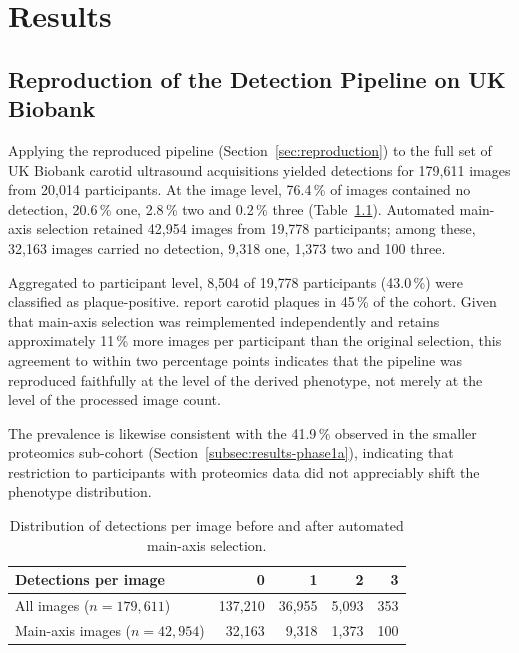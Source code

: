 \chapter{Results}
\label{ch:results}

\section{Reproduction of the Detection Pipeline on UK Biobank}
\label{sec:results-reproduction}

Applying the reproduced pipeline (Section~\ref{sec:reproduction}) to the full set of UK Biobank
carotid ultrasound acquisitions yielded detections for 179{,}611 images from 20{,}014
participants. At the image level, 76.4\,\% of images contained no detection, 20.6\,\% one,
2.8\,\% two and 0.2\,\% three (Table~\ref{tab:plaque-counts}). Automated main-axis selection
retained 42{,}954 images from 19{,}778 participants; among these, 32{,}163 images carried no
detection, 9{,}318 one, 1{,}373 two and 100 three.

Aggregated to participant level, 8{,}504 of 19{,}778 participants (43.0\,\%) were classified as
plaque-positive. \textcite{omarov2024deep} report carotid plaques in 45\,\% of the cohort. Given
that main-axis selection was reimplemented independently and retains approximately 11\,\% more
images per participant than the original selection, this agreement to within two percentage
points indicates that the pipeline was reproduced faithfully at the level of the derived
phenotype, not merely at the level of the processed image count.

The prevalence is likewise consistent with the 41.9\,\% observed in the smaller proteomics
sub-cohort (Section~\ref{subsec:results-phase1a}), indicating that restriction to participants
with proteomics data did not appreciably shift the phenotype distribution.

\begin{table}[H]
\centering
\caption[Image-level plaque counts]{Distribution of detections per image before and after
automated main-axis selection.}
\label{tab:plaque-counts}
\begin{tabular}{lrrrr}
\hline
Detections per image & 0 & 1 & 2 & 3 \\
\hline
All images ($n=179{,}611$)        & 137{,}210 & 36{,}955 & 5{,}093 & 353 \\
Main-axis images ($n=42{,}954$)   & 32{,}163  & 9{,}318  & 1{,}373 & 100 \\
\hline
\end{tabular}
\end{table}

